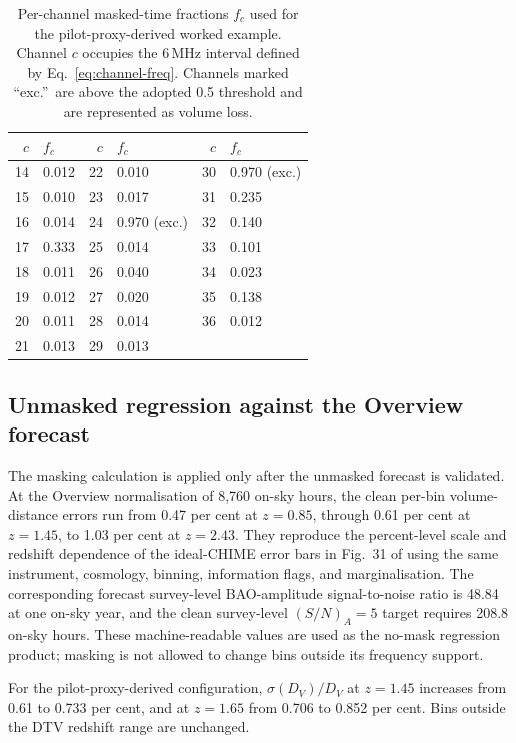 \begin{table}[t]
\centering
\caption{Per-channel masked-time fractions $f_c$ used for the
pilot-proxy-derived worked example. Channel $c$ occupies the 6\,MHz
interval defined by Eq.~\eqref{eq:channel-freq}. Channels marked
``exc.''\ are above the adopted 0.5 threshold and are represented as
volume loss.}
\label{tab:mask}
\small
\begin{tabular}{rl|rl|rl}
\toprule
$c$ & $f_c$ & $c$ & $f_c$ & $c$ & $f_c$ \\
\midrule
14 & 0.012 & 22 & 0.010 & 30 & 0.970 (exc.) \\
15 & 0.010 & 23 & 0.017 & 31 & 0.235 \\
16 & 0.014 & 24 & 0.970 (exc.) & 32 & 0.140 \\
17 & 0.333 & 25 & 0.014 & 33 & 0.101 \\
18 & 0.011 & 26 & 0.040 & 34 & 0.023 \\
19 & 0.012 & 27 & 0.020 & 35 & 0.138 \\
20 & 0.011 & 28 & 0.014 & 36 & 0.012 \\
21 & 0.013 & 29 & 0.013 & & \\
\bottomrule
\end{tabular}
\end{table}

\subsection{Unmasked regression against the Overview forecast}
\label{sec:regression}

The masking calculation is applied only after the unmasked forecast is
validated. At the Overview normalisation of 8,760 on-sky hours, the
clean per-bin volume-distance errors run from 0.47 per cent at
$z=0.85$, through 0.61 per cent at $z=1.45$, to 1.03 per cent at
$z=2.43$. They reproduce the percent-level scale and redshift
dependence of the ideal-CHIME error bars in Fig.~31 of
\citet{CHIMEOverview2022} using the same instrument, cosmology,
binning, information flags, and marginalisation. The corresponding
forecast survey-level BAO-amplitude signal-to-noise ratio is 48.84 at
one on-sky year, and the clean survey-level $(S/N)_A=5$ target requires
208.8 on-sky hours. These machine-readable values are used as the
no-mask regression product; masking is not allowed to change bins
outside its frequency support.

For the pilot-proxy-derived configuration, $\sigma(D_V)/D_V$ at
$z=1.45$ increases from 0.61 to 0.733 per cent, and at $z=1.65$ from
0.706 to 0.852 per cent. Bins outside the DTV redshift range are
unchanged.

